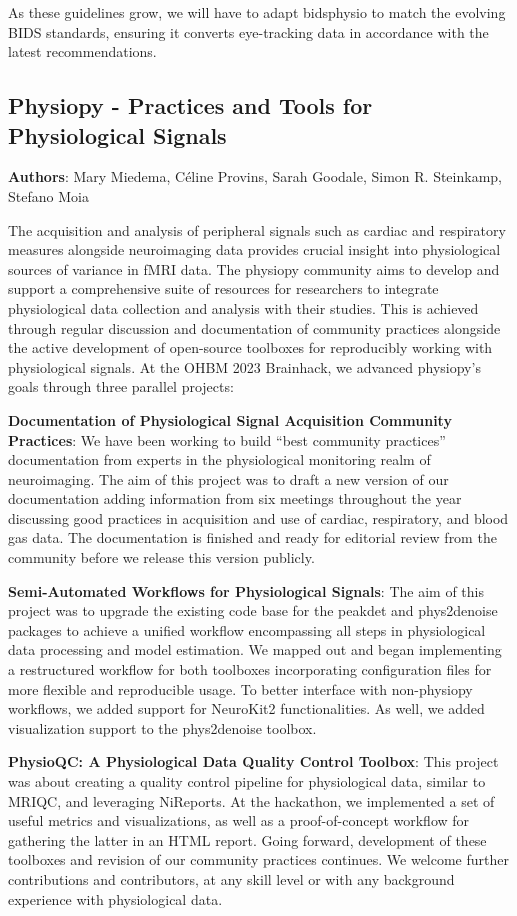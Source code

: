 \documentclass{article}
\begin{document}
As these guidelines grow, we will have to adapt bidsphysio to match the evolving BIDS standards, ensuring it converts eye-tracking data in accordance with the latest recommendations.



\subsection{Physiopy - Practices and Tools for Physiological Signals}
\textbf{Authors}: Mary Miedema, Céline Provins, Sarah Goodale, Simon R. Steinkamp, Stefano Moia

The acquisition and analysis of peripheral signals such as cardiac and respiratory measures alongside neuroimaging data provides crucial insight into physiological sources of variance in fMRI data. The physiopy community aims to develop and support a comprehensive suite of resources for researchers to integrate physiological data collection and analysis with their studies. This is achieved through regular discussion and documentation of community practices alongside the active development of open-source toolboxes for reproducibly working with physiological signals. At the OHBM 2023 Brainhack, we advanced physiopy’s goals through three parallel projects:

\textbf{Documentation of Physiological Signal Acquisition Community Practices}: We have been working to build “best community practices” documentation from experts in the physiological monitoring realm of neuroimaging. The aim of this project was to draft a new version of our documentation adding information from six meetings throughout the year discussing good practices in acquisition and use of cardiac, respiratory, and blood gas data. The documentation is finished and ready for editorial review from the community before we release this version publicly.

\textbf{Semi-Automated Workflows for Physiological Signals}: The aim of this project was to upgrade the existing code base for the peakdet and phys2denoise packages to achieve a unified workflow encompassing all steps in physiological data processing and model estimation. We mapped out and began implementing a restructured workflow for both toolboxes incorporating configuration files for more flexible and reproducible usage. To better interface with non-physiopy workflows, we added support for NeuroKit2 functionalities. As well, we added visualization support to the phys2denoise toolbox.

\textbf{PhysioQC: A Physiological Data Quality Control Toolbox}: This project was about creating a quality control pipeline for physiological data, similar to MRIQC, and leveraging NiReports. At the hackathon, we implemented a set of useful metrics and visualizations, as well as a proof-of-concept workflow for gathering the latter in an HTML report.
Going forward, development of these toolboxes and revision of our community practices continues. We welcome further contributions and contributors, at any skill level or with any background experience with physiological data.
\end{document}
